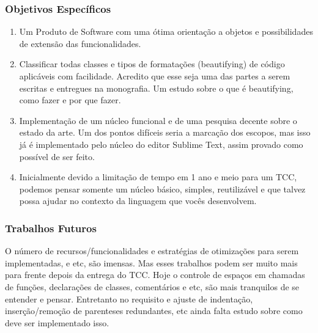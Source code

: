 \subsubsection{Objetivos Específicos}


    \begin{enumerate}[leftmargin=*]

        \item

        Um Produto de Software com uma ótima orientação a objetos e possibilidades de extensão das
        funcionalidades.

        \item

        Classificar todas classes e tipos de formatações (beautifying) de código aplicáveis com
        facilidade. Acredito que esse seja uma das partes a serem escritas e entregues na
        monografia. Um estudo sobre o que é beautifying, como fazer e por que fazer.

        \item

        Implementação de um núcleo funcional e de uma pesquisa decente sobre o estado da arte. Um
        dos pontos difíceis seria a marcação dos escopos, mas isso já é implementado pelo núcleo do
        editor Sublime Text, assim provado como possível de ser feito.

        \item

        Inicialmente devido a limitação de tempo em 1 ano e meio para um TCC, podemos pensar somente
        um núcleo básico, simples, reutilizável e que talvez possa ajudar no contexto da linguagem
        que vocês desenvolvem.

    \end{enumerate}


\subsubsection{Trabalhos Futuros}

    O número de recursos/funcionalidades e estratégias de otimizações para serem implementadas, e
    etc, são imensas. Mas esses trabalhos podem ser muito mais para frente depois da entrega do TCC.
    Hoje o controle de espaços em chamadas de funções, declarações de classes, comentários e etc,
    são mais tranquilos de se entender e pensar. Entretanto no requisito e ajuste de indentação,
    inserção/remoção de parenteses redundantes, etc ainda falta estudo sobre como deve ser
    implementado isso.

